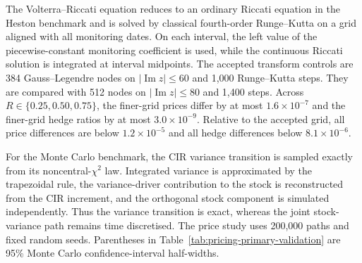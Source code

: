 \documentclass[10pt,a4paper,reqno]{amsart}
\theoremstyle{plain}
\theoremstyle{definition}
\theoremstyle{remark}
\theoremstyle{example}
\begin{document}
The Volterra--Riccati equation reduces to an ordinary Riccati equation in the Heston benchmark and is solved by classical fourth-order Runge--Kutta on a grid aligned with all monitoring dates. On each interval, the left value of the piecewise-constant monitoring coefficient is used, while the continuous Riccati solution is integrated at interval midpoints. The accepted
transform controls are 384 Gauss--Legendre nodes on \(|\operatorname{Im}z|\leq60\) and 1,000
Runge--Kutta steps.  They are compared with 512 nodes on \(|\operatorname{Im}z|\leq80\) and 1,400 steps.  Across \(R\in\{0.25,0.50,0.75\}\), the finer-grid prices differ by at most \(1.6\times10^{-7}\) and the finer-grid hedge ratios by at most \(3.0\times10^{-9}\). Relative to the accepted grid, all price differences are below  \(1.2\times10^{-5}\) and all hedge differences below \(8.1\times10^{-6}\).

 For the Monte Carlo benchmark, the CIR variance transition is sampled exactly from its
noncentral-\(\chi^2\) law.  Integrated variance is approximated by the trapezoidal rule, the
variance-driver contribution to the stock is reconstructed from the CIR increment, and the
orthogonal stock component is simulated independently.  Thus the variance transition is exact,
whereas the joint stock-variance path remains time discretised.  The price study uses 200,000
paths and fixed random seeds.  Parentheses in Table~\ref{tab:pricing-primary-validation} are 95\%
Monte Carlo confidence-interval half-widths.
\end{document}
